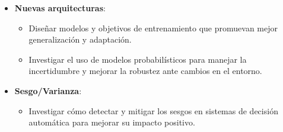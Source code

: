 \begin{itemize}
    \item \textbf{Nuevas arquitecturas}:
    \begin{itemize}
        \item Diseñar modelos y objetivos de entrenamiento que promuevan mejor generalización y adaptación.
        \item Investigar el uso de modelos probabilísticos para manejar la incertidumbre y mejorar la robustez ante cambios en el entorno.
    \end{itemize}

    \item \textbf{Sesgo/Varianza}:
    \begin{itemize}
        \item Investigar cómo detectar y mitigar los sesgos en sistemas de decisión automática para mejorar su impacto positivo.
    \end{itemize}
\end{itemize}
